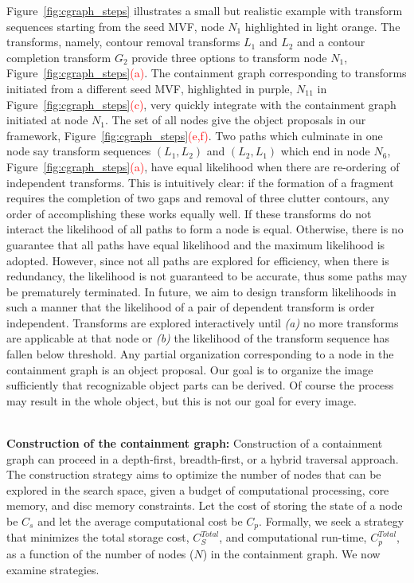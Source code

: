 Figure~\ref{fig:cgraph_steps} illustrates a small but realistic example with transform sequences starting from the seed MVF, node $N_1$ highlighted in light orange. The transforms, namely, contour removal transforms $L_1$ and $L_2$ and a contour completion transform $G_2$ provide three options to transform node $N_1$, Figure~\ref{fig:cgraph_steps}\textcolor{red}{(a)}. The containment graph corresponding to transforms initiated from a different seed MVF, highlighted in purple, $N_{11}$ in Figure~\ref{fig:cgraph_steps}\textcolor{red}{(c)}, very quickly integrate with the containment graph initiated at node $N_1$. The set of all nodes give the object proposals in our framework, Figure~\ref{fig:cgraph_steps}\textcolor{red}{(e,f)}. Two paths which culminate in one node say transform sequences $(L_1,L_2)$ and $(L_2,L_1)$ which end in node $N_6$, Figure~\ref{fig:cgraph_steps}\textcolor{red}{(a)}, have equal likelihood when there are re-ordering of independent transforms. This is intuitively clear: if the formation of a fragment requires the completion of two gaps and removal of three clutter contours, any order of accomplishing these works equally well. If these transforms do not interact the likelihood of all paths to form a node is equal. Otherwise, there is no guarantee that all paths have equal likelihood and the maximum likelihood is adopted. However, since not all paths are explored for efficiency, when there is redundancy, the likelihood is not guaranteed to be accurate, thus some paths may be prematurely terminated. In future, we aim to design transform likelihoods in such a manner that the likelihood of a pair of dependent transform is order independent. Transforms are explored interactively until \emph{(a)} no more transforms are applicable at that node or \emph{(b)} the likelihood of the transform sequence has fallen below threshold. Any partial organization corresponding to a node in the containment graph is an object proposal. Our goal is to organize the image sufficiently that recognizable object parts can be derived. Of course the process may result in the whole object, but this is not our goal for every image.  

\noindent\\
{\bf Construction of the containment graph:} Construction of a containment graph can proceed in a depth-first, breadth-first, or a hybrid traversal approach.  The construction strategy aims to optimize the number of nodes that can be explored in the search space, given a budget of computational processing, core memory, and disc memory constraints.  Let the cost of storing the state of a node be $C_s$ and let the average computational cost be $C_p$. Formally, we seek a strategy that minimizes the total storage cost, $C_S^{Total}$,  and computational run-time, $C_p^{Total}$, as a function of the number of nodes ($N$) in the containment graph. We now examine strategies. 


